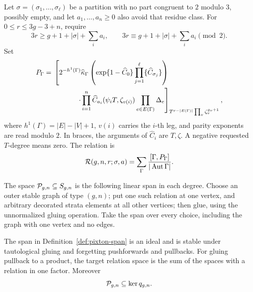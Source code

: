 \begin{definition}\label{def:pixton-span}
Let \(\sigma=(\sigma_1,\ldots,\sigma_\ell)\) be a partition with no
part congruent to \(2\) modulo \(3\), possibly empty, and let
\(a_1,\ldots,a_n\geq0\) also avoid that residue class.
For \(0\leq r\leq3g-3+n\), require
\begin{equation}\label{eq:pixton-admissibility}
3r\geq g+1+|\sigma|+\sum_i a_i,\qquad
3r\equiv g+1+|\sigma|+\sum_i a_i\pmod2.
\end{equation}
Set
\begin{align}
P_\Gamma={}&
\left[
2^{-h^1(\Gamma)}
\widehat\kappa_\Gamma
\left(
\exp\{1-\widehat C_0\}
\prod_{j=1}^{\ell}\{\widehat C_{\sigma_j}\}
\right)\right.\notag\\
&\left.\hspace{12mm}\cdot
\prod_{i=1}^n\widehat C_{a_i}(\psi_iT,\zeta_{v(i)})
\prod_{e\in E(\Gamma)}\Delta_e
\right]_{T^{r-|E(\Gamma)|}\prod_v\zeta_v^{g_v+1}},
\label{eq:pixton-graph}
\end{align}
where \(h^1(\Gamma)=|E|-|V|+1\), \(v(i)\) carries the \(i\)-th leg,
and parity exponents are read modulo \(2\). In braces, the arguments
of \(\widehat C_i\) are \(T,\zeta\). A negative requested \(T\)-degree
means zero. The relation is
\[
\mathcal R(g,n,r;\sigma,a)=
\sum_\Gamma\frac{[\Gamma,P_\Gamma]}{|\operatorname{Aut}\Gamma|}.
\]

The space \(\mathcal P_{g,n}\subseteq S_{g,n}\) is the following
linear span in each degree. Choose an outer stable graph of type
\((g,n)\); put one such relation at one vertex, and arbitrary decorated
strata elements at all other vertices; then glue, using the
unnormalized gluing operation. Take the span over every choice,
including the graph with one vertex and no edges.
\end{definition}

\begin{proposition}\label{prop:known-relations}
The span in Definition~\ref{def:pixton-span} is an ideal and is stable
under tautological gluing and forgetting pushforwards and pullbacks.
For gluing pullback to a product, the target relation space is the sum
of the spaces with a relation in one factor.
Moreover
\[
\mathcal P_{g,n}\subseteq\ker q_{g,n}.
\]
\end{proposition}

